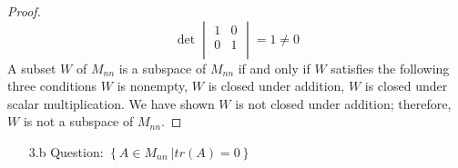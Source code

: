 \documentclass[12pt]{article}
\newcommand{\DS} [1] {${\displaystyle #1}$}
\begin{document}
\begin{proof}
\begin{equation*}
        \end{equation*}
        \begin{equation*}
                \det
                \begin{vmatrix}
                        {1} & {0} \\
                        {0} & {1} \\
                \end{vmatrix}
                = 1 \neq 0
        \end{equation*}
        A subset $W$ of $M_{nn}$ is a subspace of $M_{nn}$ if and only if
        $W$ satisfies the following three conditions $W$ is nonempty,
        $W$ is closed under addition, $W$ is closed under scalar multiplication.
        We have shown $W$ is not closed under addition; therefore, $W$ is not a subspace of $M_{nn}$.
\end{proof}
\begin{enumerate}
        \item[3.b]Question: \DS{ \left\{A \in{M_{nn}} \ | tr (A) = 0 \right\}}
\end{enumerate}
\end{document}
